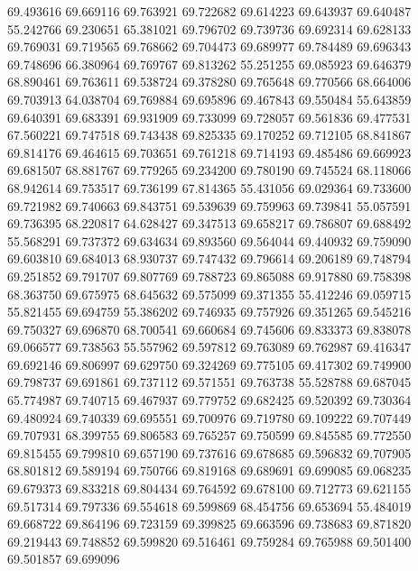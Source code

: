 69.493616
69.669116
69.763921
69.722682
69.614223
69.643937
69.640487
55.242766
69.230651
65.381021
69.796702
69.739736
69.692314
69.628133
69.769031
69.719565
69.768662
69.704473
69.689977
69.784489
69.696343
69.748696
66.380964
69.769767
69.813262
55.251255
69.085923
69.646379
68.890461
69.763611
69.538724
69.378280
69.765648
69.770566
68.664006
69.703913
64.038704
69.769884
69.695896
69.467843
69.550484
55.643859
69.640391
69.683391
69.931909
69.733099
69.728057
69.561836
69.477531
67.560221
69.747518
69.743438
69.825335
69.170252
69.712105
68.841867
69.814176
69.464615
69.703651
69.761218
69.714193
69.485486
69.669923
69.681507
68.881767
69.779265
69.234200
69.780190
69.745524
68.118066
68.942614
69.753517
69.736199
67.814365
55.431056
69.029364
69.733600
69.721982
69.740663
69.843751
69.539639
69.759963
69.739841
55.057591
69.736395
68.220817
64.628427
69.347513
69.658217
69.786807
69.688492
55.568291
69.737372
69.634634
69.893560
69.564044
69.440932
69.759090
69.603810
69.684013
68.930737
69.747432
69.796614
69.206189
69.748794
69.251852
69.791707
69.807769
69.788723
69.865088
69.917880
69.758398
68.363750
69.675975
68.645632
69.575099
69.371355
55.412246
69.059715
55.821455
69.694759
55.386202
69.746935
69.757926
69.351265
69.545216
69.750327
69.696870
68.700541
69.660684
69.745606
69.833373
69.838078
69.066577
69.738563
55.557962
69.597812
69.763089
69.762987
69.416347
69.692146
69.806997
69.629750
69.324269
69.775105
69.417302
69.749900
69.798737
69.691861
69.737112
69.571551
69.763738
55.528788
69.687045
65.774987
69.740715
69.467937
69.779752
69.682425
69.520392
69.730364
69.480924
69.740339
69.695551
69.700976
69.719780
69.109222
69.707449
69.707931
68.399755
69.806583
69.765257
69.750599
69.845585
69.772550
69.815455
69.799810
69.657190
69.737616
69.678685
69.596832
69.707905
68.801812
69.589194
69.750766
69.819168
69.689691
69.699085
69.068235
69.679373
69.833218
69.804434
69.764592
69.678100
69.712773
69.621155
69.517314
69.797336
69.554618
69.599869
68.454756
69.653694
55.484019
69.668722
69.864196
69.723159
69.399825
69.663596
69.738683
69.871820
69.219443
69.748852
69.599820
69.516461
69.759284
69.765988
69.501400
69.501857
69.699096
